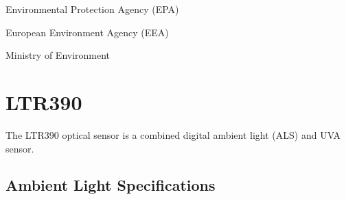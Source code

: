 \documentclass[letterpaper,10pt,english]{sphinxmanual}
\begin{document}
\sphinxAtStartPar
Environmental Protection Agency (EPA)


\sphinxAtStartPar
European Environment Agency (EEA)


\sphinxAtStartPar
Ministry of Environment


\sphinxstepscope


\section{LTR390}
\label{\detokenize{sensors/ltr390:ltr390}}\label{\detokenize{sensors/ltr390:id1}}\label{\detokenize{sensors/ltr390::doc}}

\sphinxAtStartPar
The LTR390 optical sensor is a combined digital ambient light (ALS) and UVA sensor.


\subsection{Ambient Light Specifications}
\label{\detokenize{sensors/ltr390:ambient-light-specifications}}
\end{document}
